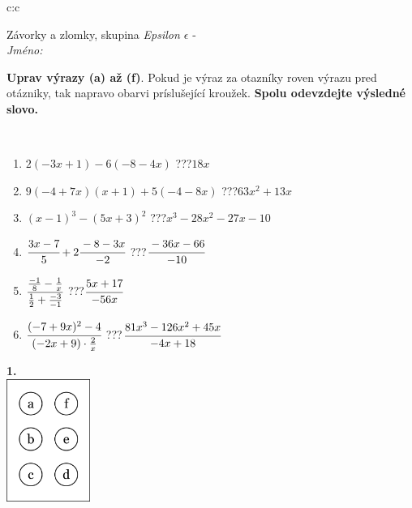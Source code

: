 \documentclass[10pt]{report}
\begin{document}
\begin{tabular}{c:c}
\begin{minipage}[c][104.5mm][t]{0.5\linewidth}
\begin{center}
\vspace{7mm}
{\huge Závorky a zlomky, skupina \textit{Epsilon $\epsilon$} -}\\[5mm]
\textit{Jméno:}\phantom{xxxxxxxxxxxxxxxxxxxxxxxxxxxxxxxxxxxxxxxxxxxxxxxxxxxxxxxxxxxxxxxxx}\\[5mm]
\begin{minipage}{0.95\linewidth}
\begin{center}
\textbf{Uprav výrazy (a) až (f)}. Pokud je výraz za otazníky roven výrazu pred otázniky, tak napravo obarvi príslušející kroužek. \textbf{Spolu odevzdejte výsledné slovo.}
\end{center}
\end{minipage}
\\[1mm]
\begin{minipage}{0.79\linewidth}
\begin{center}
\begin{varwidth}{\linewidth}
\begin{enumerate}
\normalsize
\item $2(-3x+1)-6(-8-4x)$\quad \dotfill\; ???\;\dotfill \quad $18x$
\item $9(-4+7x)(x+1)+5(-4-8x)$\quad \dotfill\; ???\;\dotfill \quad $63x^2+13x$
\item $(x-1)^3-(5x+3)^2$\quad \dotfill\; ???\;\dotfill \quad $x^3-28x^2-27x-10$
\item $\cfrac{3x-7}{5}+2\cfrac{-8-3x}{-2}$\quad \dotfill\; ???\;\dotfill \quad $\cfrac{-36x-66}{-10}$
\item $\cfrac{\frac{-1}{8}-\frac{1}{x}}{\frac{1}{2}+\frac{-3}{-1}}$\quad \dotfill\; ???\;\dotfill \quad $\cfrac{5x+17}{-56x}$
\item $\cfrac{(-7+9x)^2-4}{(-2x+9)\cdot\frac{2}{x}}$\quad \dotfill\; ???\;\dotfill \quad $\cfrac{81x^3-126x^2+45x}{-4x+18}$
\end{enumerate}
\end{varwidth}
\end{center}
\end{minipage}
\begin{minipage}{0.20\linewidth}
\begin{center}
{\Huge\bfseries 1.} \\[2mm]
\includegraphics[height=40mm]{../images/braille.png}

\end{center}
\end{minipage}
\end{center}
\end{minipage}
\end{tabular}
\end{document}
